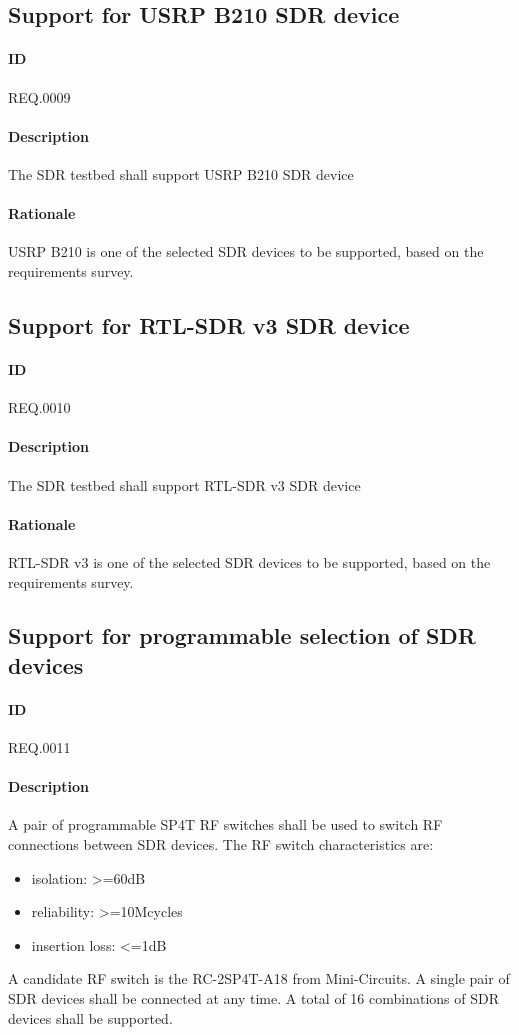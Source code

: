 \documentclass[english,titlepage,a4paper]{report}
\begin{document}
\subsection{Support for USRP B210 SDR device}
\paragraph{ID}
REQ.0009
\paragraph{Description}
The SDR testbed shall support USRP B210 SDR device
\paragraph{Rationale}
USRP B210 is one of the selected SDR devices to be supported, based on the requirements survey.

\subsection{Support for RTL-SDR v3 SDR device}
\paragraph{ID}
REQ.0010
\paragraph{Description}
The SDR testbed shall support RTL-SDR v3 SDR device
\paragraph{Rationale}
RTL-SDR v3 is one of the selected SDR devices to be supported, based on the requirements survey.

\subsection{Support for programmable selection of SDR devices}
\paragraph{ID}
REQ.0011
\paragraph{Description}
A pair of programmable SP4T RF switches shall be used to switch RF connections between SDR devices.
The RF switch characteristics are:
\begin{itemize}
\item isolation: >=60dB
\item reliability: >=10Mcycles
\item insertion loss: <=1dB
\end{itemize}
A candidate RF switch is the RC-2SP4T-A18 from Mini-Circuits.
A single pair of SDR devices shall be connected at any time.
A total of 16 combinations of SDR devices shall be supported.
\end{document}
